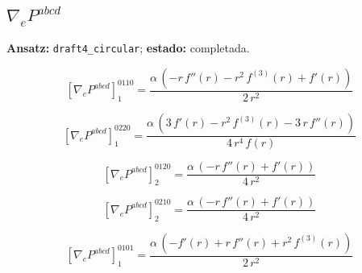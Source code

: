 \documentclass[11pt]{article}
\begin{document}
\subsection*{$ \nabla_e P^{abcd} $}
\textbf{Ansatz:} \texttt{draft4\_circular}; \textbf{estado:} completada.\par
\begin{dmath*}[breakdepth={5}]
\left[\nabla_e P^{abcd}\right]_{1}^{0110} = \frac{\alpha\,\left(-r\,f''\!\left(r\right) - {r}^{2}\,f^{(3)}\!\left(r\right) + f'\!\left(r\right)\right)}{2\,{r}^{2}}
\end{dmath*}
\par\smallskip
\begin{dmath*}[breakdepth={5}]
\left[\nabla_e P^{abcd}\right]_{1}^{0220} = \frac{\alpha\,\left(3\,f'\!\left(r\right) - {r}^{2}\,f^{(3)}\!\left(r\right) - 3\,r\,f''\!\left(r\right)\right)}{4\,{r}^{4}\,f\!\left(r\right)}
\end{dmath*}
\par\smallskip
\begin{dmath*}[breakdepth={5}]
\left[\nabla_e P^{abcd}\right]_{2}^{0120} = \frac{\alpha\,\left(-r\,f''\!\left(r\right) + f'\!\left(r\right)\right)}{4\,{r}^{2}}
\end{dmath*}
\par\smallskip
\begin{dmath*}[breakdepth={5}]
\left[\nabla_e P^{abcd}\right]_{2}^{0210} = \frac{\alpha\,\left(-r\,f''\!\left(r\right) + f'\!\left(r\right)\right)}{4\,{r}^{2}}
\end{dmath*}
\par\smallskip
\begin{dmath*}[breakdepth={5}]
\left[\nabla_e P^{abcd}\right]_{1}^{0101} = \frac{\alpha\,\left(-f'\!\left(r\right) + r\,f''\!\left(r\right) + {r}^{2}\,f^{(3)}\!\left(r\right)\right)}{2\,{r}^{2}}
\end{dmath*}
\par\smallskip
\end{document}
